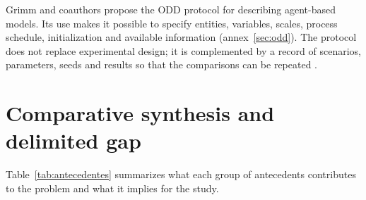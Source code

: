 Grimm and coauthors \cite{grimm2020odd} propose the ODD protocol for describing agent-based models. Its use makes it possible to specify entities, variables, scales, process schedule, initialization and available information (annex~\ref{sec:odd}). The protocol does not replace experimental design; it is complemented by a record of scenarios, parameters, seeds and results so that the comparisons can be repeated \cite{railsback2019agent,thiele2014facilitating}.

\section{Comparative synthesis and delimited gap}

Table~\ref{tab:antecedentes} summarizes what each group of antecedents contributes to the problem and what it implies for the study.

